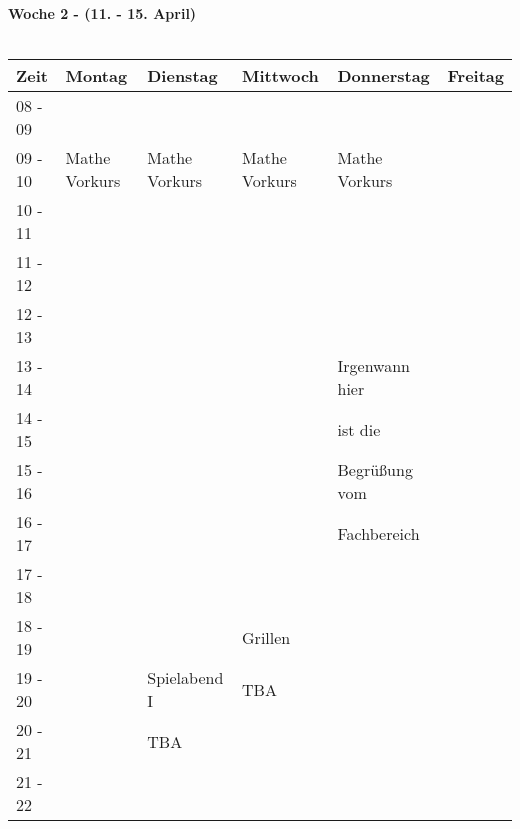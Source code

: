 \pagebreak
\textbf{Woche 2 - (11. - 15. April)}\\
\\
\begin{tabular}{|l|p{}|p{}|p{}|p{}|p{}|} \hline
\hline
Zeit    & Montag & Dienstag & Mittwoch & Donnerstag & Freitag \\ \hline
08 - 09 & & & & & \\ \cline{1-1} \cline{3-5} 
09 - 10 & \footnotesize{Mathe Vorkurs} & \footnotesize{Mathe Vorkurs} & \footnotesize{Mathe Vorkurs} & \footnotesize{Mathe Vorkurs} & \\ \cline{1-2}
10 - 11 & & & & & \\ \cline{1-1}
11 - 12 & & & & & \\ \cline{1-1}
12 - 13 & & & & & \\ \cline{1-1}
13 - 14 & & & & \cellcolor{lightgray} \footnotesize Irgenwann hier & \\ \cline{1-1}
14 - 15 & & & & \cellcolor{lightgray} \footnotesize ist die& \\ \cline{1-1}
15 - 16 & & & & \cellcolor{lightgray} \footnotesize Begrüßung vom & \\ \hline
  16 - 17 & & & & \cellcolor{lightgray} \footnotesize Fachbereich & \\ \cline{1-1}
17 - 18 & & & & & \\ \cline{1-1} \cline{4-4}
18 - 19 & & & \cellcolor{lightlightgray} \footnotesize{Grillen} & & \\ \cline{1-1} \cline{3-3}
  19 - 20 & & \cellcolor{lightlightgray} \footnotesize{Spielabend I} & \cellcolor{lightlightgray} \scriptsize{TBA} & & \\ \cline{1-1}
  20 - 21 & & \cellcolor{lightlightgray} \scriptsize{TBA} & \cellcolor{lightlightgray} & & \\ \cline{1-1}
21 - 22 & & \cellcolor{lightlightgray} & \cellcolor{lightlightgray} & & \\ \hline
\end{tabular}


